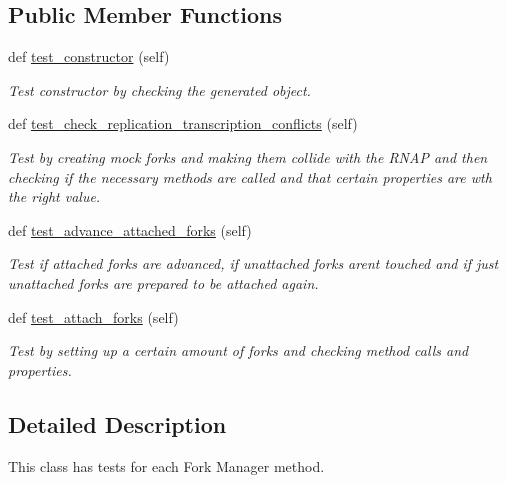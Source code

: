 \subsection*{Public Member Functions}
\begin{DoxyCompactItemize}
\item 
def \mbox{\hyperlink{classReDyMo_1_1test_1_1test__fork__manager_1_1TestForkManager_a0cc1b12c6ffc4a4eceea4d1f20c9f00b}{test\+\_\+constructor}} (self)
\begin{DoxyCompactList}\small\item\em Test constructor by checking the generated object. \end{DoxyCompactList}\item 
def \mbox{\hyperlink{classReDyMo_1_1test_1_1test__fork__manager_1_1TestForkManager_a8bc2159fd040cc64a9615f7803bdc3e9}{test\+\_\+check\+\_\+replication\+\_\+transcription\+\_\+conflicts}} (self)
\begin{DoxyCompactList}\small\item\em Test by creating mock forks and making them collide with the R\+N\+AP and then checking if the necessary methods are called and that certain properties are wth the right value. \end{DoxyCompactList}\item 
def \mbox{\hyperlink{classReDyMo_1_1test_1_1test__fork__manager_1_1TestForkManager_ab5acb3bdc477230a7ae59631d0e98827}{test\+\_\+advance\+\_\+attached\+\_\+forks}} (self)
\begin{DoxyCompactList}\small\item\em Test if attached forks are advanced, if unattached forks aren\textquotesingle{}t touched and if just unattached forks are prepared to be attached again. \end{DoxyCompactList}\item 
def \mbox{\hyperlink{classReDyMo_1_1test_1_1test__fork__manager_1_1TestForkManager_ae621827af6f1101fd22b62b1deaea084}{test\+\_\+attach\+\_\+forks}} (self)
\begin{DoxyCompactList}\small\item\em Test by setting up a certain amount of forks and checking method calls and properties. \end{DoxyCompactList}\end{DoxyCompactItemize}


\subsection{Detailed Description}
This class has tests for each Fork Manager method. 

